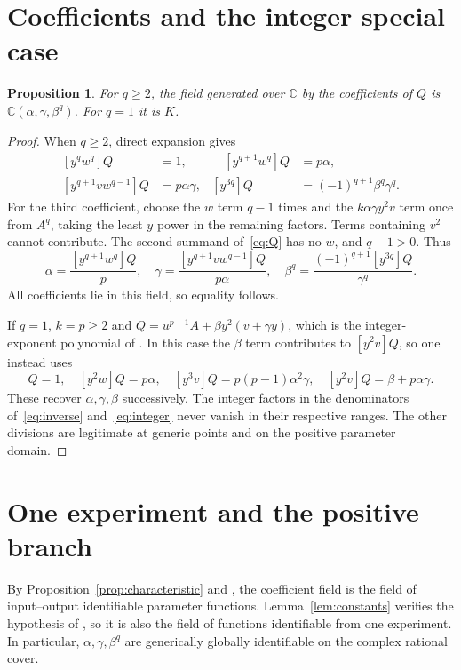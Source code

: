\documentclass[10pt,a4paper]{article}
\newtheorem{proposition}[theorem]{Proposition}
\theoremstyle{definition}\newtheorem{definition}[theorem]{Definition}
\newcommand{\C}{\mathbb C}
\newcommand{\coef}[1]{[#1]Q}
\begin{document}
\section{Coefficients and the integer special case}
\label{sec:coefficients}
\begin{proposition}
\label{prop:coefficients}
For $q\geq2$, the field generated over $\C$ by the coefficients of $Q$
is $\C(\alpha,\gamma,\beta^q)$. For $q=1$ it is $K$.
\end{proposition}
\begin{proof}
When $q\geq2$, direct expansion gives
\begin{equation}
\begin{aligned}
\coef{y^qw^q}&=1,&\quad \coef{y^{q+1}w^q}&=p\alpha,\\
\coef{y^{q+1}vw^{q-1}}&=p\alpha\gamma,&
\coef{y^{3q}}&=(-1)^{q+1}\beta^q\gamma^q.
\end{aligned}
\label{eq:coeff}
\end{equation}
For the third coefficient, choose the $w$ term $q-1$ times and the
$k\alpha\gamma y^2v$ term once from $A^q$, taking the least $y$ power
in the remaining factors. Terms containing $v^2$ cannot contribute.
The second summand of~\eqref{eq:Q} has no $w$, and $q-1>0$.
Thus
\begin{equation}
\alpha=\frac{\coef{y^{q+1}w^q}}p,\quad
\gamma=\frac{\coef{y^{q+1}vw^{q-1}}}{p\alpha},\quad
\beta^q=\frac{(-1)^{q+1}\coef{y^{3q}}}{\gamma^q}.
\label{eq:inverse}
\end{equation}
All coefficients lie in this field, so equality follows.

If $q=1$, $k=p\geq2$ and $Q=u^{p-1}A+\beta y^2(v+\gamma y)$,
which is the integer-exponent polynomial of \cite{V1}. In this case
the $\beta$ term contributes to $\coef{y^2v}$, so one instead uses
\begin{equation}
\coef{yw}=1,\quad \coef{y^2w}=p\alpha,\quad
\coef{y^3v}=p(p-1)\alpha^2\gamma,\quad
\coef{y^2v}=\beta+p\alpha\gamma.
\label{eq:integer}
\end{equation}
These recover $\alpha,\gamma,\beta$ successively. The integer factors
in the denominators of~\eqref{eq:inverse} and~\eqref{eq:integer} never
vanish in their respective ranges. The other divisions are legitimate
at generic points and on the positive parameter domain.
\end{proof}

\section{One experiment and the positive branch}
\label{sec:identification}
By Proposition~\ref{prop:characteristic} and
\cite[Corollary~5.7]{OPT}, the coefficient field is the field of
input--output identifiable parameter functions. Lemma~\ref{lem:constants}
verifies the hypothesis of \cite[Theorem~4.7]{OPT}, so it is also the
field of functions identifiable from one experiment. In particular,
$\alpha,\gamma,\beta^q$ are generically globally identifiable on the
complex rational cover.
\end{document}
